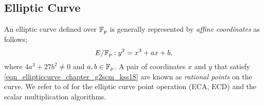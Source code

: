 \subsection{Elliptic Curve}
An elliptic curve \cite{washington2003elliptic} defined over ${\mathbb{F}}_{p}$ is generally represented by \textit{affine coordinates} \cite{Silverman} as follows;
\begin{equation}\label{eqn_ellipticcurve_chapter_g2scm_kss18}
E/{\mathbb{F}}_{p} : y^2=x^3+ax+b,
\end{equation}
where $ 4a^3+27b^2 \neq 0$ and $a,b \in {\mathbb{F}}_{p}$. A pair of coordinates $x$ and $y$ that satisfy \eqref{eqn_ellipticcurve_chapter_g2scm_kss18} are known as \textit{rational points} on the curve. 
We refer to  of  for the elliptic curve point operation (ECA, ECD) and the scalar multiplication algorithms.



